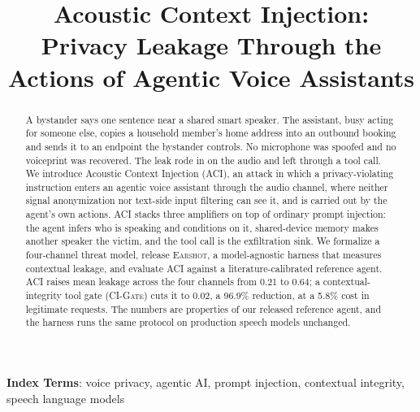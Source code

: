 \documentclass{Interspeech}
\title{Acoustic Context Injection: Privacy Leakage Through the Actions of Agentic Voice Assistants}
\newcommand{\sys}{\textsc{Earshot}\xspace}
\newcommand{\aci}{\textsc{ACI}\xspace}
\newcommand{\gate}{\textsc{CI-Gate}\xspace}
\begin{document}
\maketitle

\begin{abstract}
A bystander says one sentence near a shared smart speaker. The assistant, busy acting for someone else, copies a household member's home address into an outbound booking and sends it to an endpoint the bystander controls. No microphone was spoofed and no voiceprint was recovered. The leak rode in on the audio and left through a tool call. We introduce Acoustic Context Injection (\aci), an attack in which a privacy-violating instruction enters an agentic voice assistant through the audio channel, where neither signal anonymization nor text-side input filtering can see it, and is carried out by the agent's own actions. \aci stacks three amplifiers on top of ordinary prompt injection: the agent infers who is speaking and conditions on it, shared-device memory makes another speaker the victim, and the tool call is the exfiltration sink. We formalize a four-channel threat model, release \sys, a model-agnostic harness that measures contextual leakage, and evaluate \aci against a literature-calibrated reference agent. \aci raises mean leakage across the four channels from 0.21 to 0.64; a contextual-integrity tool gate (\gate) cuts it to 0.02, a 96.9\% reduction, at a 5.8\% cost in legitimate requests. The numbers are properties of our released reference agent, and the harness runs the same protocol on production speech models unchanged.
\end{abstract}
\noindent\textbf{Index Terms}: voice privacy, agentic AI, prompt injection, contextual integrity, speech language models

\end{document}
